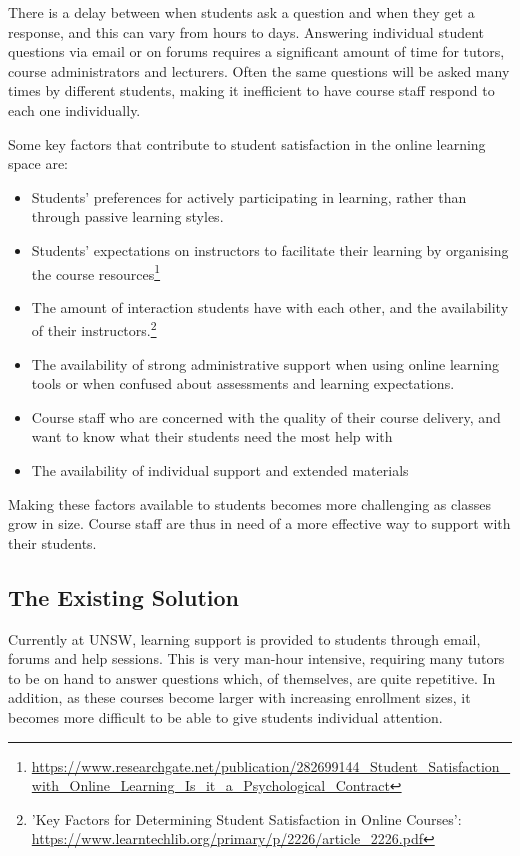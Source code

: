 \documentclass{article}
\begin{document}
There is a delay between when students ask a question and when they get a response, and this can vary from hours to days. Answering individual student questions via email or on forums requires a significant amount of time for tutors, course administrators and lecturers. Often the same questions will be asked many times by different students, making it inefficient to have course staff respond to each one individually.

Some key factors that contribute to student satisfaction in the online learning space are:
\begin{itemize}
  \item Students' preferences for actively participating in learning, rather than through passive learning styles.
  \item Students' expectations on instructors to facilitate their learning by organising the course resources\footnote{\url{https://www.researchgate.net/publication/282699144_Student_Satisfaction_with_Online_Learning_Is_it_a_Psychological_Contract}}
  \item The amount of interaction students have with each other, and the availability of their instructors.\footnote{'Key Factors for Determining Student Satisfaction in Online Courses': \url{https://www.learntechlib.org/primary/p/2226/article_2226.pdf}}
  \item The availability of strong administrative support when using online learning tools or when confused about assessments and learning expectations.
  \item Course staff who are concerned with the quality of their course delivery, and want to know what their students need the most help with
  \item The availability of individual support and extended materials
\end{itemize}

Making these factors available to students becomes more challenging as classes grow in size. Course staff are thus in need of a more effective way to support with their students. 

\subsection{The Existing Solution}

Currently at UNSW, learning support is provided to students through email, forums and help sessions. This is very man-hour intensive, requiring many tutors to be on hand to answer questions which, of themselves, are quite repetitive. In addition, as these courses become larger with increasing enrollment sizes, it becomes more difficult to be able to give students individual attention.
\end{document}
